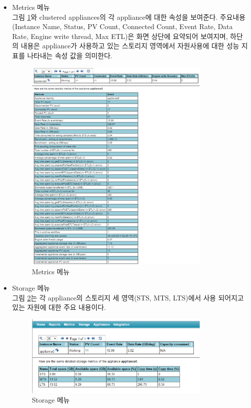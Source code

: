 \documentclass[11pt
  , a4paper
  , article
  , oneside
]{memoir}
\begin{document}
\begin{itemize}
	\item Metrics 메뉴 \\
	그림 \ref{fig:metrics}와 clustered appliances의 각 appliance에 대한 속성을 보여준다. 주요내용(Instance Name, Status, PV Count, Connected Count, Event Rate, Data Rate, Engine write thread, Max ETL)은 화면 상단에 요약되어 보여지며, 하단의 내용은 appliance가 사용하고 있는 스토리지 영역에서 자원사용에 대한 성능 지표를 나타내는 속성 값을 의미한다.

	\begin{figure}[h!]
		\centering
		\includegraphics[width=0.85\textwidth, height=0.8\textwidth]{./images/metrics.eps}
		\caption{Metrics 메뉴}
		\label{fig:metrics} 
	\end{figure}
\clearpage

	\item Storage 메뉴 \\
	그림 \ref{fig:storage}는 각 appliance의 스토리지 세 영역(STS, MTS, LTS)에서 사용 되어지고 있는 자원에 대한 주요 내용이다.
	
	\begin{figure}[h!]
		\centering
		\includegraphics[width=0.85\textwidth, height=0.3\textwidth]{./images/storage.eps}
		\caption{Storage 메뉴}
		\label{fig:storage} 
	\end{figure}


\end{itemize}
\end{document}
